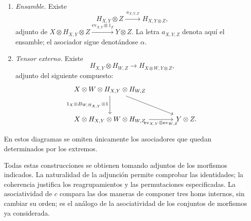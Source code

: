 \begin{prop}
\begin{enumerate}[label=\textup{(\roman*)}]
\item \emph{Ensamble.} Existe
\[
H_{X,Y}\otimes Z\xrightarrow{\ a_{X,Y,Z}\ }H_{X,Y\otimes Z},
\]
adjunto de
$X\otimes H_{X,Y}\otimes Z
\xrightarrow{\mathrm{ev}_{X,Y}\otimes1_Z}Y\otimes Z$.
La letra $a_{X,Y,Z}$ denota aquí el ensamble; el asociador sigue denotándose $\alpha$.
\item \emph{Tensor externo.} Existe
\[
H_{X,Y}\otimes H_{W,Z}\longrightarrow H_{X\otimes W,Y\otimes Z},
\]
adjunto del siguiente compuesto:
\[
\begin{tikzcd}[column sep=large,row sep=large]
X\otimes W\otimes H_{X,Y}\otimes H_{W,Z}
 \arrow[d,"{1_X\otimes B_{W,H_{X,Y}}\otimes1}"']
 \arrow[dr]\\
X\otimes H_{X,Y}\otimes W\otimes H_{W,Z}
 \arrow[r,"{\mathrm{ev}_{X,Y}\otimes\mathrm{ev}_{W,Z}}"']
 &Y\otimes Z .
\end{tikzcd}
\]
\end{enumerate}
En estos diagramas se omiten únicamente los asociadores que quedan determinados por los extremos.
\end{prop}

Todas estas construcciones se obtienen tomando adjuntos de los morfismos indicados. La naturalidad de la adjunción permite comprobar las identidades; la coherencia justifica los reagrupamientos y las permutaciones especificadas. La asociatividad de $c$ compara las dos maneras de componer tres homs internos, sin cambiar su orden; es el análogo de la asociatividad de los conjuntos de morfismos ya considerada.

